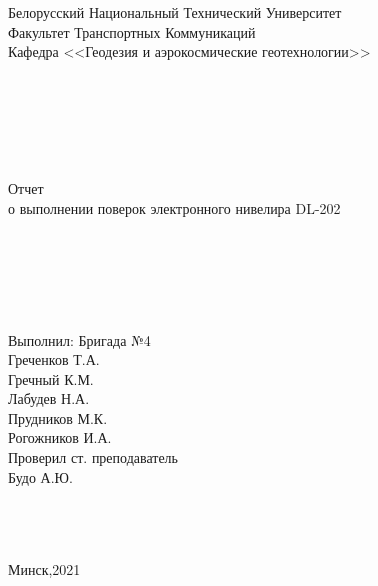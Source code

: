 \documentclass[a4paper]{article}
\begin{document}
\begin{titlepage}
\large{

\begin{center}
Белорусский Национальный Технический Университет\\
Факультет Транспортных Коммуникаций\\
Кафедра <<Геодезия и аэрокосмические геотехнологии>>\\
~\\
~\\
~\\
~\\
~\\
~\\
Отчет\\
о выполнении поверок электронного нивелира DL-202\\
~\\
~\\
~\\
~\\
~\\
\end{center}

\begin{flushright}
Выполнил: Бригада №4\\
Греченков Т.А.\\
Гречный К.М.\\
Лабудев Н.А.\\
Прудников М.К.\\
Рогожников И.А.\\
Проверил ст. преподаватель\\
Будо А.Ю.
~\\
~\\
~\\
~\\
\begin{center}
Минск,2021
\end{center}
\end{flushright}
}
\end{titlepage}
\end{document}
